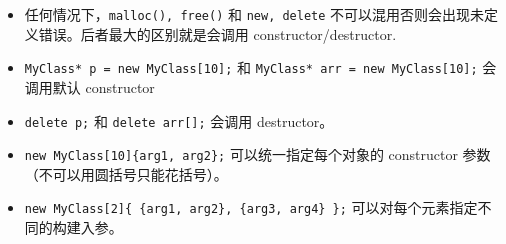 
\begin{itemize}
\item 任何情况下，\verb`malloc(), free()` 和 \verb`new, delete` 不可以混用否则会出现未定义错误。后者最大的区别就是会调用 constructor/destructor.
\item \verb`MyClass* p = new MyClass[10];` 和 \verb`MyClass* arr = new MyClass[10];` 会调用默认 constructor
\item \verb`delete p;` 和 \verb`delete arr[];` 会调用 destructor。
\item \verb`new MyClass[10]{arg1, arg2};` 可以统一指定每个对象的 constructor 参数（不可以用圆括号只能花括号）。
\item \verb`new MyClass[2]{ {arg1, arg2}, {arg3, arg4} };` 可以对每个元素指定不同的构建入参。
\end{itemize}
